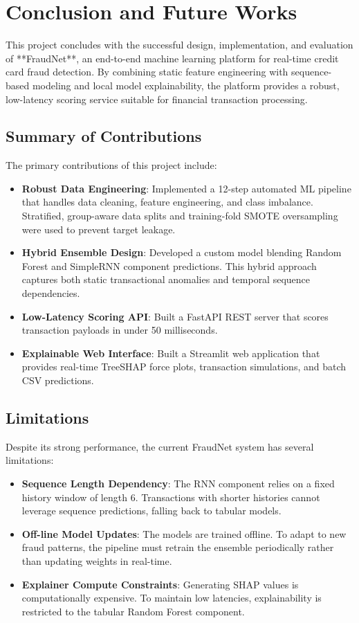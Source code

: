 \chapter{Conclusion and Future Works}

This project concludes with the successful design, implementation, and evaluation of **FraudNet**, an end-to-end machine learning platform for real-time credit card fraud detection. By combining static feature engineering with sequence-based modeling and local model explainability, the platform provides a robust, low-latency scoring service suitable for financial transaction processing.

\section{Summary of Contributions}

The primary contributions of this project include:
\begin{itemize}
    \item \textbf{Robust Data Engineering}: Implemented a 12-step automated ML pipeline that handles data cleaning, feature engineering, and class imbalance. Stratified, group-aware data splits and training-fold SMOTE oversampling were used to prevent target leakage.
    \item \textbf{Hybrid Ensemble Design}: Developed a custom model blending Random Forest and SimpleRNN component predictions. This hybrid approach captures both static transactional anomalies and temporal sequence dependencies.
    \item \textbf{Low-Latency Scoring API}: Built a FastAPI REST server that scores transaction payloads in under 50 milliseconds.
    \item \textbf{Explainable Web Interface}: Built a Streamlit web application that provides real-time TreeSHAP force plots, transaction simulations, and batch CSV predictions.
\end{itemize}

\section{Limitations}

Despite its strong performance, the current FraudNet system has several limitations:
\begin{itemize}
    \item \textbf{Sequence Length Dependency}: The RNN component relies on a fixed history window of length 6. Transactions with shorter histories cannot leverage sequence predictions, falling back to tabular models.
    \item \textbf{Off-line Model Updates}: The models are trained offline. To adapt to new fraud patterns, the pipeline must retrain the ensemble periodically rather than updating weights in real-time.
    \item \textbf{Explainer Compute Constraints}: Generating SHAP values is computationally expensive. To maintain low latencies, explainability is restricted to the tabular Random Forest component.
\end{itemize}

